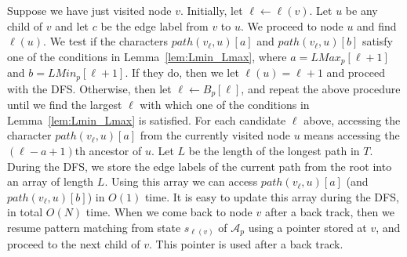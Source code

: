 \documentclass[a4paper,11pt]{article}
\newcommand{\Lmin}[1]{\mathit{LMin}_{#1}}
\newcommand{\Lmax}[1]{\mathit{LMax}_{#1}}
\newcommand{\Path}{\mathit{path}}
\begin{document}
Suppose we have just visited node $v$.
Initially, let $\ell \leftarrow \ell(v)$.
Let $u$ be any child of $v$ and let $c$ be the edge label from $v$ to $u$.
We proceed to node $u$ and find $\ell(u)$.
We test if the characters $\Path(v_\ell, u)[a]$ and $\Path(v_\ell, u)[b]$
satisfy one of the conditions in Lemma~\ref{lem:Lmin_Lmax},
where $a = \Lmax{p}[\ell+1]$ and $b = \Lmin{p}[\ell+1]$.
If they do, then we let $\ell(u) = \ell+1$ and proceed with the DFS.
Otherwise, then let $\ell \leftarrow B_p[\ell]$,
and repeat the above procedure
until we find the largest $\ell$ with which one of the conditions
in Lemma~\ref{lem:Lmin_Lmax} is satisfied.
For each candidate $\ell$ above,
accessing the character $\Path(v_{\ell}, u)[a]$ from the currently visited node
$u$ means accessing the $(\ell-a+1)$th ancestor of $u$.
Let $L$ be the length of the longest path in $T$.
During the DFS, we store the edge labels of the current path from the root
into an array of length $L$.
Using this array we can access $\Path(v_{\ell}, u)[a]$ (and $\Path(v_{\ell}, u)[b]$)
in $O(1)$ time.
It is easy to update this array during the DFS, in total $O(N)$ time.
When we come back to node $v$ after a back track,
then we resume pattern matching from state $s_{\ell(v)}$ of $\mathcal{A}_p$
using a pointer stored at $v$,
and proceed to the next child of $v$.
This pointer is used after a back track.
\end{document}
